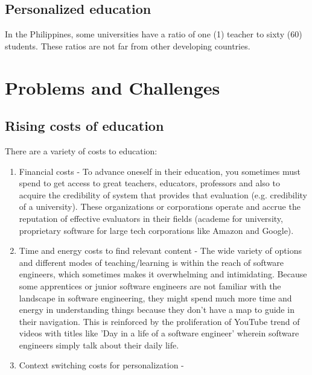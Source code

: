 \documentclass[conference]{IEEEtran}
\newcommand{\tomegg}{
  \href{http://tome.gg}{Tome.gg}
}
\begin{document}


\subsection{Personalized education}

In the Philippines, some universities have a ratio of one (1) teacher to sixty (60)
students. These ratios are not far from other developing countries.

\section{Problems and Challenges} 
\label{sec:problems_challenges}

\subsection{Rising costs of education}

There are a variety of costs to education:

\begin{enumerate}
  \item Financial costs - To advance oneself in their education, you sometimes must
  spend to get access to great teachers, educators, professors and also to acquire
  the credibility of system that provides that evaluation (e.g. credibility of
  a university). These organizations or corporations operate and accrue the 
  reputation of effective evaluators in their fields (academe for university,
  proprietary software for large tech corporations like Amazon and Google).
  \item Time and energy costs to find relevant content - The wide variety of 
  options and different modes of  teaching/learning is within the reach of 
  software engineers, which sometimes makes it overwhelming and intimidating. 
  Because some apprentices or junior software engineers are not familiar with
  the landscape in software engineering, they might spend much more time and
  energy in understanding things because they don't have a map to guide in 
  their navigation. This is reinforced by the proliferation of YouTube trend
  of videos with titles like 'Day in a life of a  software engineer' wherein
  software engineers simply talk about their daily life.
  \item Context switching costs for personalization - 
\end{enumerate}
\end{document}
